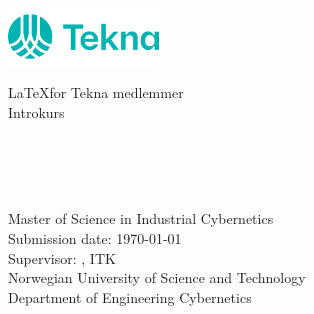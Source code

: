 	\includegraphics[width=0.3\textwidth]{hovedlogo.png}
	\begin{center}
		\vspace*{1cm}
		\LaTeX\space for Tekna medlemmer \\
		Introkurs\\[5cm]
	\end{center}		
		\huge{\oppgavetittel}\\
		\\[1cm]
		
		\Large{\textbf{\navn}}\\
		\vfill

		\normalsize{Master of Science in Industrial Cybernetics\\
		Submission date: \today\\
		Supervisor: \supervisor, ITK\\[1cm]
		Norwegian University of Science and Technology\\
		Department of Engineering Cybernetics}
	
	\newpage\null\thispagestyle{empty}\newpage